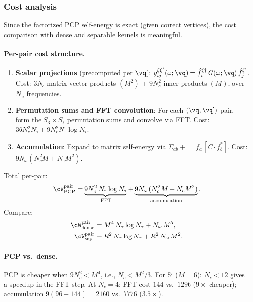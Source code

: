 \subsubsection{Cost analysis}
\label{sssub:pcp_cost}

Since the factorized PCP self-energy is exact (given correct vertices),
the cost comparison with dense and separable kernels is meaningful.

\paragraph{Per-pair cost structure.}
\begin{enumerate}
  \item \textbf{Scalar projections} (precomputed per $\vq$):
    $g_{ij}^{\xi\xi'}(\omega;\vq) = \hat{f}_i^{\xi\dagger}\,G(\omega;\vq)\,\hat{f}_j^{\xi'}$.
    Cost: $3N_c$ matrix-vector products $(M^2)$ + $9N_c^2$ inner
    products $(M)$, over $N_\omega$ frequencies.

  \item \textbf{Permutation sums and FFT convolution}: For each
    $(\vq,\vq')$ pair, form the $S_3 \times S_3$ permutation sums
    and convolve via FFT.
    Cost: $36 N_c^2 N_\tau + 9 N_c^2 N_\tau\log N_\tau$.

  \item \textbf{Accumulation}: Expand to matrix self-energy via
    $\Sigma_{ab} \mathrel{+}= f_a\,[C \cdot f_b^*]$.
    Cost: $9 N_\omega (N_c^2 M + N_c M^2)$.
\end{enumerate}

Total per-pair:
\begin{equation}\label{eq:pcp_cost}
  \cW_\mathrm{PCP}^\mathrm{pair}
  = \underbrace{9 N_c^2\,N_\tau \log N_\tau}_{\text{FFT}}
  + \underbrace{9 N_\omega\,(N_c^2 M + N_c M^2)}_{\text{accumulation}}.
\end{equation}
Compare:
\begin{align}
  \cW_\mathrm{dense}^\mathrm{pair}
  &= M^4\,N_\tau\log N_\tau + N_\omega\,M^5,
  \label{eq:dense_cost_recap} \\
  \cW_\mathrm{sep}^\mathrm{pair}
  &= R^2\,N_\tau\log N_\tau + R^2\,N_\omega\,M^2.
  \label{eq:sep_cost_recap}
\end{align}

\paragraph{PCP vs.\ dense.}
PCP is cheaper when $9N_c^2 < M^4$, i.e., $N_c < M^2/3$.
For Si ($M = 6$): $N_c < 12$ gives a speedup in the FFT step.
At $N_c = 4$: FFT cost $144$ vs.\ $1296$ ($9\times$ cheaper);
accumulation $9(96 + 144) = 2160$ vs.\ $7776$ ($3.6\times$).


